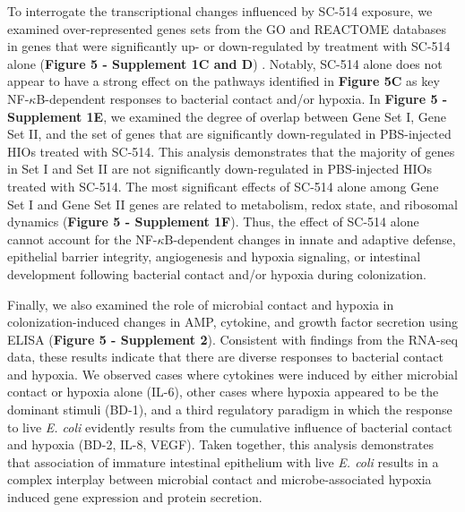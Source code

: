 \documentclass[9pt,lineo]{elife}
\begin{document}
To interrogate the transcriptional changes influenced by SC-514 exposure, we examined over-represented genes sets from the GO and REACTOME databases in genes that were significantly up- or down-regulated by treatment with SC-514 alone (\textbf{Figure 5 - Supplement 1C and D}) . Notably, SC-514 alone does not appear to have a strong effect on the pathways identified in \textbf{Figure 5C} as key NF-\(\kappa\)B-dependent responses to bacterial contact and/or hypoxia. In \textbf{Figure 5 - Supplement 1E}, we examined the degree of overlap between Gene Set I, Gene Set II, and the set of genes that are significantly down-regulated in PBS-injected HIOs treated with SC-514. This analysis demonstrates that the majority of genes in Set I and Set II are not significantly down-regulated in PBS-injected HIOs treated with SC-514. The most significant effects of SC-514 alone among Gene Set I and Gene Set II genes are related to metabolism, redox state, and ribosomal dynamics (\textbf{Figure 5 - Supplement 1F}). Thus, the effect of SC-514 alone cannot account for the NF-\(\kappa\)B-dependent changes in innate and adaptive defense, epithelial barrier integrity, angiogenesis and hypoxia signaling, or intestinal development following bacterial contact and/or hypoxia during colonization. 

Finally, we also examined the role of microbial contact and hypoxia in colonization-induced changes in AMP, cytokine, and growth factor secretion using ELISA (\textbf{Figure 5 - Supplement 2}). Consistent with findings from the RNA-seq data, these results indicate that there are diverse responses to bacterial contact and hypoxia. We observed cases where cytokines were induced by either microbial contact or hypoxia alone (IL-6), other cases where hypoxia appeared to be the dominant stimuli (BD-1), and a third regulatory paradigm in which the response to live \emph{E. coli} evidently results from the cumulative influence of bacterial contact and hypoxia (BD-2, IL-8, VEGF). Taken together, this analysis demonstrates that association of immature intestinal epithelium with live \emph{E. coli} results in a complex interplay between microbial contact and microbe-associated hypoxia induced gene expression and protein secretion. 
\end{document}
